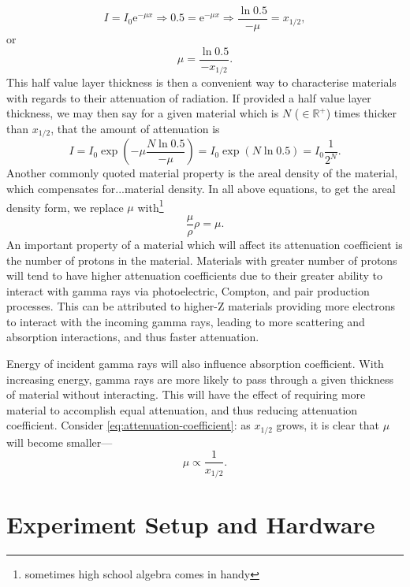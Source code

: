 \documentclass[a4paper]{article}
\begin{document}
\begin{equation}
    I=I_{0}\mathrm{e}^{-\mu x}\Rightarrow 0.5 = \mathrm{e}^{-\mu x}\Rightarrow \frac{\ln{0.5}}{-\mu}=x_{1/2},
\end{equation}
or
\begin{equation}\label{eq:attenuation-coefficient}
    \mu=\frac{\ln{0.5}}{-x_{1/2}}.
\end{equation}
This half value layer thickness is then a convenient way to characterise materials with regards to their attenuation of radiation. If provided a half value layer thickness, we may then say for a given material which is $N$ ($\in\mathbb{R}^{+}$) times thicker than $x_{1/2}$, that the amount of attenuation is
\begin{equation}
    I=I_{0}\exp\left(-\mu\frac{N\ln0.5}{-\mu}\right)=I_{0}\exp\left(N\ln0.5\right)=I_{0}\frac{1}{2^{N}}.
\end{equation}
Another commonly quoted material property is the areal density of the material, which compensates for...material density. In all above equations, to get the areal density form, we replace $\mu$ with\footnote{sometimes high school algebra comes in handy}
\begin{equation}
    \frac{\mu}{\rho}\rho=\mu.
\end{equation}
An important property of a material which will affect its attenuation coefficient is the number of protons in the material. Materials with greater number of protons will tend to have higher attenuation coefficients due to their greater ability to interact with gamma rays via photoelectric, Compton, and pair production processes. This can be attributed to higher-Z materials providing more electrons to interact with the incoming gamma rays, leading to more scattering and absorption interactions, and thus faster attenuation.

Energy of incident gamma rays will also influence absorption coefficient. With increasing energy, gamma rays are more likely to pass through a given thickness of material without interacting. This will have the effect of requiring more material to accomplish equal attenuation, and thus reducing attenuation coefficient. Consider \eqref{eq:attenuation-coefficient}: as $x_{1/2}$ grows, it is clear that $\mu$ will become smaller---
\begin{equation}
    \mu\propto\frac{1}{x_{1/2}}.
\end{equation}
\section{Experiment Setup and Hardware}
\end{document}
